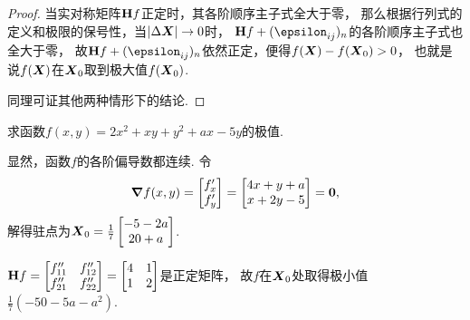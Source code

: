 \begin{theorem}
\begin{proof}
当实对称矩阵\(\boldsymbol{\operatorname{H}} f\)正定时，其各阶顺序主子式全大于零，
那么根据行列式的定义和极限的保号性，当\(\abs{\Delta\boldsymbol{X}}\to0\)时，
\(\hessian f + (\epsilon_{ij})_n\)的各阶顺序主子式也全大于零，
故\(\hessian f + (\epsilon_{ij})_n\)依然正定，便得\(f(\boldsymbol{X}) - f(\boldsymbol{X}_{0}) > 0\)，
也就是说\(f(\boldsymbol{X})\)在\(\boldsymbol{X}_{0}\)取到极大值\(f(\boldsymbol{X}_{0})\).

同理可证其他两种情形下的结论.
\end{proof}
\end{theorem}

\begin{example}
求函数\(f(x,y) = 2x^2 + xy + y^2 + ax - 5y\)的极值.
\begin{solution}
显然，函数\(f\)的各阶偏导数都连续.
令\begin{equation*}
	\grad f(x,y) = \begin{bmatrix} f'_x \\ f'_y \end{bmatrix}
	= \begin{bmatrix} 4x+y+a \\ x+2y-5 \end{bmatrix} = \boldsymbol{0},
\end{equation*}
解得驻点为\(\boldsymbol{X}_{0} = \frac{1}{7} \begin{bmatrix} -5-2a \\ 20+a \end{bmatrix}\).

\(\boldsymbol{\operatorname{H}} f = \begin{bmatrix}
	f''_{11} & f''_{12} \\
	f''_{21} & f''_{22}
\end{bmatrix}
= \begin{bmatrix}
4 & 1 \\
1 & 2
\end{bmatrix}\)是正定矩阵，
故\(f\)在\(\boldsymbol{X}_{0}\)处取得极小值\(\frac{1}{7} (-50-5a-a^2)\).
\end{solution}
\end{example}

